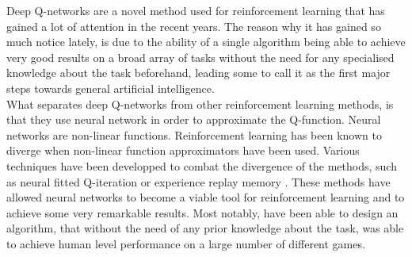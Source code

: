 Deep Q-networks\cite{mnih2013playing} are a novel method used for reinforcement learning that has gained a lot of attention in the recent years. The reason why it has gained so much notice lately, is due to the ability of a single algorithm being able to achieve very good results on a broad array of tasks without the need for any specialised knowledge about the task beforehand, leading some to call it as the first major steps towards general artificial intelligence.\\
What separates deep Q-networks from other reinforcement learning methods, is that they use neural network in order to approximate the Q-function. Neural networks are non-linear functions. Reinforcement learning has been known to diverge when non-linear function approximators have been used. Various techniques have been developped to combat the divergence of the methods, such as neural fitted Q-iteration \cite{riedmiller2005neural} or experience replay memory \cite{Mnih2015}. These methods have allowed neural networks to become a viable tool for reinforcement learning and to achieve some very remarkable results. Most notably, \cite{Mnih2015} have been able to design an algorithm, that without the need of any prior knowledge about the task, was able to achieve human level performance on a large number of different games.

































